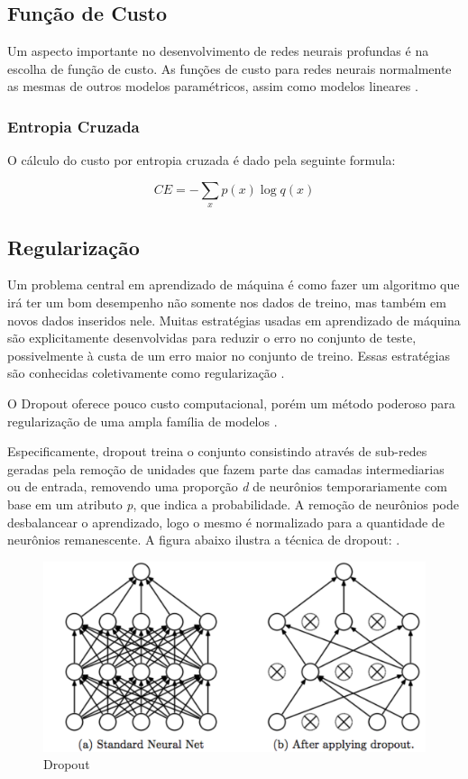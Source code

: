 \documentclass[12pt]{article}
\begin{document}
\subsection{Função de Custo}

Um aspecto importante no desenvolvimento de redes neurais profundas é na escolha de função de custo. As funções de custo para redes neurais normalmente as mesmas de outros modelos paramétricos, assim como modelos lineares \cite{Goodfellow-et-al-2016}.

\subsubsection{Entropia Cruzada}

O cálculo do custo por entropia cruzada é dado pela seguinte formula:

\begin{equation}
    CE = -\sum\limits_{x} p(x)\log q(x)
\end{equation}

\subsection{Regularização}

Um problema central em aprendizado de máquina é como fazer um algoritmo que irá ter um bom desempenho não somente nos dados de treino, mas também em novos dados inseridos nele. Muitas estratégias usadas em aprendizado de máquina são explicitamente desenvolvidas para reduzir o erro no conjunto de teste, possivelmente à custa de um erro maior no conjunto de treino. Essas estratégias são conhecidas coletivamente como regularização \cite{Goodfellow-et-al-2016}.

O Dropout oferece pouco custo computacional, porém um método poderoso para regularização de uma ampla família de modelos \cite{DBLP:journals/corr/abs-1207-0580}.

Especificamente, dropout treina o conjunto consistindo através de sub-redes geradas pela remoção de unidades que fazem parte das camadas intermediarias ou de entrada, removendo uma proporção \textit{d} de neurônios temporariamente com base em um atributo \textit{p}, que indica a probabilidade. A remoção de neurônios pode desbalancear o aprendizado, logo o mesmo é normalizado para a quantidade de neurônios remanescente. A figura abaixo ilustra a técnica de dropout: \cite{Goodfellow-et-al-2016}.

\begin{figure}[!htb]
\centering
\includegraphics[width=.8\textwidth]{images/dropout.png}
\caption{Dropout}
\label{fig:dropout}
\end{figure}
\end{document}
